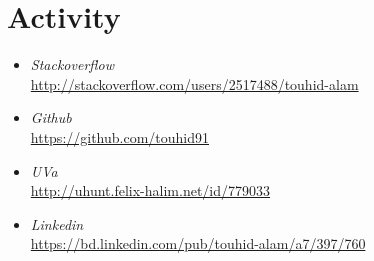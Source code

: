 \section{Activity}

\begin{itemize}
  \item \textit{Stackoverflow}\\\url{http://stackoverflow.com/users/2517488/touhid-alam}
  \item\textit{Github}\\\url{https://github.com/touhid91}
  \item\textit{UVa}\\\url{http://uhunt.felix-halim.net/id/779033}
  \item\textit{Linkedin}\\\url{https://bd.linkedin.com/pub/touhid-alam/a7/397/760}
\end{itemize}
